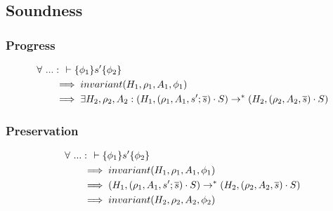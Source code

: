\documentclass[11pt,a4paper]{article}
\begin{document}
\subsection{Soundness}
\subsubsection{Progress}
\begin{align*}
\forall~ ... &:~~ \vdash\{\phi_1\}s'\{\phi_2\} 
\\ &\implies invariant(H_1, \rho_1, A_1, \phi_1)
\\ &\implies \exists H_2, \rho_2, A_2 : (H_1, (\rho_1, A_1, s' ; \overline{s}) \cdot S)
							\rightarrow^* (H_2, (\rho_2, A_2, \overline{s}) \cdot S)
\end{align*}

\subsubsection{Preservation}
\begin{align*}
\forall~ ... &:~~ \vdash\{\phi_1\}s'\{\phi_2\} 
\\ &\implies invariant(H_1, \rho_1, A_1, \phi_1)
\\ &\implies (H_1, (\rho_1, A_1, s' ; \overline{s}) \cdot S)
  \rightarrow^* (H_2, (\rho_2, A_2, \overline{s}) \cdot S)
\\ &\implies invariant(H_2, \rho_2, A_2, \phi_2)
\end{align*}
\end{document}
